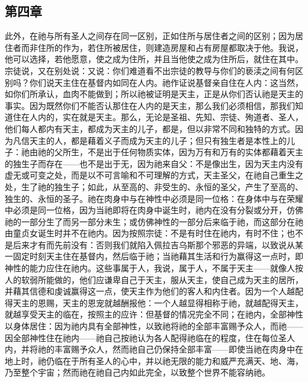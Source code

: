 
\subsection{第四章}

\par

此外，在祂与所有圣人之间存在同一区别，正如住所与居住者之间的区别；因为居住者而非住所的作为，若住所被居住，则建造房屋和占有房屋都取决于他。我说，他可以选择，若他愿意，使之成为住所，并且当他使之成为住所后，就住在其中。宗徒说，又在别处说：又说：你们难道看不出宗徒的教导与你们的亵渎之间有何区别吗？你们说天主住在基督内如同在人内。祂作证说基督亲自住在人内：这当然，如你们所承认，血肉不能做到；所以祂被证明是天主，正是从你们否认祂是天主的事实。因为既然你们不能否认那住在人内的是天主，那么我们必须相信，那我们知道住在人内的，实在就是天主。那么，无论是圣祖、先知、宗徒、殉道者、圣人，他们每人都内有天主，都成为天主的儿子，都是，但以非常不同和独特的方式。因为凡信天主的人，都是藉着义子而成为天主的儿子；但只有独生者是本性上的儿子：祂由祂的父所生，不是出于任何物质实体，因为万有和万有的实体都藉着天主的独生子而存在——也不是出于无，因为祂来自父：不是像出生，因为天主内没有虚无或可变之处，而是以不可言喻和不可理解的方式，天主圣父，在祂自己重生之处，生了祂的独生子；如此，从至高的、非受生的、永恒的圣父，产生了至高的、独生的、永恒的圣子。祂在肉身中与在神性中必须是同一位格：在身体中与在荣耀中必须是同一位格，因为当祂即将在肉身中诞生时，祂内在没有分裂或分开，仿佛祂的一部分生了而另一部分未生；或仿佛神性的一部分后来临于祂，而这部分在祂由童贞女诞生时并不在祂内。因为按照宗徒：不是有时住在祂内，有时不住；也不是后来才有而先前没有：否则我们就陷入佩拉吉乌斯那个邪恶的异端，以致说从某一固定时刻天主住在基督内，然后临于祂；当祂藉其生活和行为赢得这一点时，即神性的能力应住在祂内。这些事属于人，我说，属于人，不属于天主——就像人按人的软弱所能做的，他们应谦卑自己于天主，服从天主，使自己成为天主的居所，并藉其信德和虔诚赢得这一点，使天主作为他们的客人和内住者。因为一个人越配得天主的恩赐，天主的恩宠就越酬报他：一个人越显得相称于祂，就越配得天主，就越享受天主的临在，按照主的应许：但基督的情况完全不同；在祂内，全部神性以身体居住：因为祂内具有全部神性，以致祂将祂的全部丰富赐予众人，而祂——因全部神性住在祂内——祂自己按祂认为各人配得祂临在的程度，住在每位圣人内，并将祂的丰富赐予众人，然而祂自己仍保持全部丰富——即使当祂在肉身中在地上时，祂仍临在于所有圣人的心中，并以祂无限的能力和威严充满天、地、海，乃至整个宇宙；然而祂在祂自己内如此完全，以致整个世界不能容纳祂。\par

